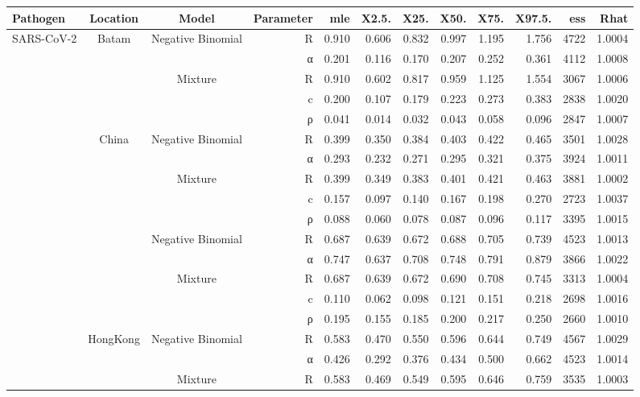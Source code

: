 \begin{table}[ht]
\centering
\begin{tabular}{lccrrrrrrrrr}
  \hline
Pathogen & Location & Model & Parameter & mle & X2.5. & X25. & X50. & X75. & X97.5. & ess & Rhat \\ 
  \hline
SARS-CoV-2 & Batam & Negative Binomial & R & 0.910 & 0.606 & 0.832 & 0.997 & 1.195 & 1.756 & 4722 & 1.0004 \\ 
   &  &  & α & 0.201 & 0.116 & 0.170 & 0.207 & 0.252 & 0.361 & 4112 & 1.0008 \\ 
   &  & Mixture & R & 0.910 & 0.602 & 0.817 & 0.959 & 1.125 & 1.554 & 3067 & 1.0006 \\ 
   &  &  & c & 0.200 & 0.107 & 0.179 & 0.223 & 0.273 & 0.383 & 2838 & 1.0020 \\ 
   &  &  & ρ & 0.041 & 0.014 & 0.032 & 0.043 & 0.058 & 0.096 & 2847 & 1.0007 \\ 
   & China & Negative Binomial & R & 0.399 & 0.350 & 0.384 & 0.403 & 0.422 & 0.465 & 3501 & 1.0028 \\ 
   &  &  & α & 0.293 & 0.232 & 0.271 & 0.295 & 0.321 & 0.375 & 3924 & 1.0011 \\ 
   &  & Mixture & R & 0.399 & 0.349 & 0.383 & 0.401 & 0.421 & 0.463 & 3881 & 1.0002 \\ 
   &  &  & c & 0.157 & 0.097 & 0.140 & 0.167 & 0.198 & 0.270 & 2723 & 1.0037 \\ 
   &  &  & ρ & 0.088 & 0.060 & 0.078 & 0.087 & 0.096 & 0.117 & 3395 & 1.0015 \\ 
   &  & Negative Binomial & R & 0.687 & 0.639 & 0.672 & 0.688 & 0.705 & 0.739 & 4523 & 1.0013 \\ 
   &  &  & α & 0.747 & 0.637 & 0.708 & 0.748 & 0.791 & 0.879 & 3866 & 1.0022 \\ 
   &  & Mixture & R & 0.687 & 0.639 & 0.672 & 0.690 & 0.708 & 0.745 & 3313 & 1.0004 \\ 
   &  &  & c & 0.110 & 0.062 & 0.098 & 0.121 & 0.151 & 0.218 & 2698 & 1.0016 \\ 
   &  &  & ρ & 0.195 & 0.155 & 0.185 & 0.200 & 0.217 & 0.250 & 2660 & 1.0010 \\ 
   & HongKong & Negative Binomial & R & 0.583 & 0.470 & 0.550 & 0.596 & 0.644 & 0.749 & 4567 & 1.0029 \\ 
   &  &  & α & 0.426 & 0.292 & 0.376 & 0.434 & 0.500 & 0.662 & 4523 & 1.0014 \\ 
   &  & Mixture & R & 0.583 & 0.469 & 0.549 & 0.595 & 0.646 & 0.759 & 3535 & 1.0003 \\ 

\end{tabular}
\end{table}
